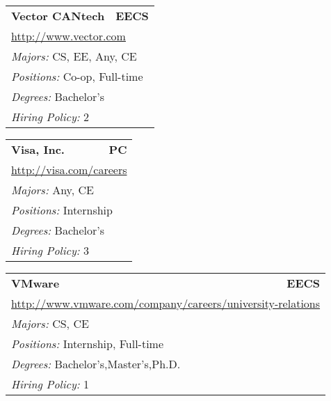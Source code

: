 \documentclass[twoside]{article}
\begin{document}
\begin{center}
\begin{multicols}{3}
\begin{FlushLeft}
\begin{minipage}{.9\columnwidth}
\end{minipage}
 
\begin{minipage}{.9\columnwidth}\begin{tabularx}{.95\columnwidth}{Xr}
                 {\Large\bf Vector CANtech} & {\Large\bf EECS}\\
    \multicolumn{2}{p{.95\columnwidth}}{\url{http://www.vector.com}}\\
    \multicolumn{2}{p{.95\columnwidth}}{\emph{Majors:} CS, EE, Any, CE}\\
    \multicolumn{2}{p{.95\columnwidth}}{\emph{Positions:} Co-op, Full-time}\\
    \multicolumn{2}{p{.95\columnwidth}}{\emph{Degrees:} Bachelor's}\\
    \multicolumn{2}{p{.95\columnwidth}}{\emph{Hiring Policy:} 2}\\
    \end{tabularx}
    
\end{minipage}
 
\begin{minipage}{.9\columnwidth}\begin{tabularx}{.95\columnwidth}{Xr}
                 {\Large\bf Visa, Inc.} & {\Large\bf PC}\\
    \multicolumn{2}{p{.95\columnwidth}}{\url{http://visa.com/careers}}\\
    \multicolumn{2}{p{.95\columnwidth}}{\emph{Majors:} Any, CE}\\
    \multicolumn{2}{p{.95\columnwidth}}{\emph{Positions:} Internship}\\
    \multicolumn{2}{p{.95\columnwidth}}{\emph{Degrees:} Bachelor's}\\
    \multicolumn{2}{p{.95\columnwidth}}{\emph{Hiring Policy:} 3}\\
    \end{tabularx}
    
\end{minipage}
 
\begin{minipage}{.9\columnwidth}\begin{tabularx}{.95\columnwidth}{Xr}
                 {\Large\bf VMware} & {\Large\bf EECS}\\
    \multicolumn{2}{p{.95\columnwidth}}{\url{http://www.vmware.com/company/careers/university-relations}}\\
    \multicolumn{2}{p{.95\columnwidth}}{\emph{Majors:} CS, CE}\\
    \multicolumn{2}{p{.95\columnwidth}}{\emph{Positions:} Internship, Full-time}\\
    \multicolumn{2}{p{.95\columnwidth}}{\emph{Degrees:} Bachelor's,Master's,Ph.D.}\\
    \multicolumn{2}{p{.95\columnwidth}}{\emph{Hiring Policy:} 1}\\
    \end{tabularx}
    

\end{minipage}
\end{FlushLeft}
\end{multicols}
\end{center}
\end{document}
